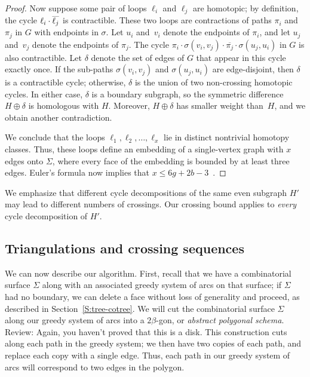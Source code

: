 \documentclass[letterpaper,review]{siamart190516}
\def\reverse#1{\smash{\overline{#1}}}
\def\rnote#1{\color{red}Review: #1 \color{black}}
\begin{document}
\begin{proof}
Now suppose some pair of loops $\ell_i$ and $\ell_j$ are homotopic; by definition, the cycle $\ell_i\cdot\reverse{\ell_j}$ is contractible.  These two loops are contractions of paths $\pi_i$ and $\pi_j$ in $G$ with endpoints in $\sigma$.  Let $u_i$ and~$v_i$ denote the endpoints of $\pi_i$, and let $u_j$ and~$v_j$ denote the endpoints of $\pi_j$.  The cycle $\pi_i \cdot \sigma(v_i,v_j) \cdot \overline{\pi_j} \cdot \sigma(u_j, u_i)$ in $G$ is also contractible.  Let $\delta$ denote the set of edges of $G$ that appear in this cycle exactly once.  If the sub-paths $\sigma(v_i,v_j)$ and $\sigma(u_j, u_i)$ are edge-disjoint, then $\delta$ is a contractible cycle; otherwise, $\delta$ is the union of two non-crossing homotopic cycles.  In either case, $\delta$ is a boundary subgraph, so the symmetric difference $H\oplus\delta$ is homologous with $H$.  Moreover, $H\oplus\delta$ has smaller weight than~$H$, and we obtain another contradiction.

We conclude that the loops $\ell_1, \ell_2, \dots, \ell_x$ lie in distinct nontrivial homotopy classes.  Thus, these loops define an embedding of a single-vertex graph with $x$ edges onto $\Sigma$, where every face of the embedding is bounded by at least three edges.  Euler's formula now implies that $x\le 6g+2b-3$~\cite[Lemma~2.1]{ccelw-scsih-08}.
\end{proof}

We emphasize that different cycle decompositions of the same even subgraph $H'$ may lead to
different numbers of crossings.  Our crossing bound applies to \emph{every} cycle decomposition of
$H'$.

\subsection{Triangulations and crossing sequences}
\label{SS:homotopy-triangulation}


We can now describe our algorithm.  First, recall that we have a combinatorial surface $\Sigma$ along with an associated greedy system of arcs on that surface; if  $\Sigma$ had no boundary, we can delete a face without loss of generality and proceed, as described in Section~\ref{S:tree-cotree}.
We will cut the combinatorial surface $\Sigma$ along our greedy system of arcs into a $2\beta$-gon, or \emph{abstract polygonal schema}.  
\rnote{Again, you haven't proved that this is a disk. }
This construction cuts along each path in the greedy system; we then have two copies of each path,  and replace each copy  with a single edge.  Thus, each path in our greedy system of arcs will correspond to two edges in the polygon.
\end{document}
